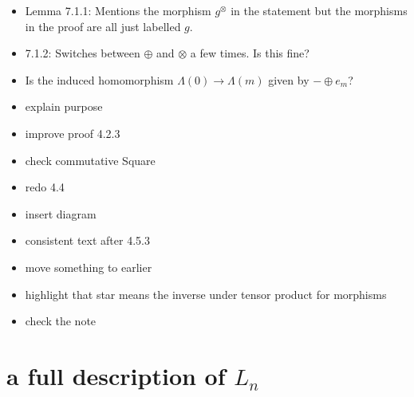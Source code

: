 \documentclass{amsart}
\begin{document}
\begin{itemize}
\item Lemma 7.1.1: Mentions the morphism $g^\otimes$ in the statement but the morphisms in the proof are all just labelled $g$.



\item 7.1.2: Switches between $\oplus$ and $\otimes$ a few times. Is this fine?
\item Is the induced homomorphism $\Lambda(0) \rightarrow \Lambda(m)$ given by $- \oplus e_m$?

\item explain purpose
\item improve proof 4.2.3

\item check commutative Square

\item redo 4.4
\item insert diagram

\item consistent text after 4.5.3
\item move something to earlier


\item highlight that star means the inverse under tensor product for morphisms




\item check the note


\end{itemize}



\section{a full description of $L_n $}
\end{document}
